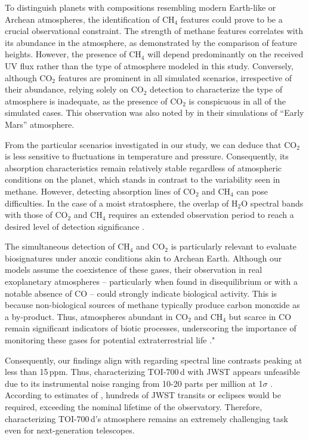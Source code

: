 To distinguish planets with compositions resembling modern Earth-like or Archean atmospheres, the identification of CH$_4$ features could prove to be a crucial observational constraint. 
The strength of methane features correlates with its abundance in the atmosphere, as demonstrated by the comparison of feature heights. However, the presence of CH$_4$ will depend predominantly on the received UV flux rather than the type of atmosphere modeled in this study. Conversely, although CO$_2$ features are prominent in all simulated scenarios, irrespective of their abundance, relying solely on CO$_2$ detection to characterize the type of atmosphere is inadequate, as the presence of CO$_2$ is conspicuous in all of the simulated cases. This observation was also noted by \cite{Suissa2020b} in their simulations of ``Early Mars'' atmosphere.

From the particular scenarios investigated in our study, we can deduce that CO$_2$ is less sensitive to fluctuations in temperature and pressure. Consequently, its absorption characteristics remain relatively stable regardless of atmospheric conditions on the planet, which stands in contrast to the variability seen in methane. However, detecting absorption lines of CO$_2$ and CH$_4$ can pose difficulties. In the case of a moist stratosphere, the overlap of H$_2$O spectral bands with those of CO$_2$ and CH$_4$ requires an extended observation period to reach a desired level of detection significance \citep[see][]{Mikal-Evans.et.al.2022MNRAS.510..980M}.

The simultaneous detection of CH$_4$ and CO$_2$ is particularly relevant to evaluate biosignatures under anoxic conditions akin to Archean Earth. Although our models assume the coexistence of these gases, their observation in real exoplanetary atmospheres -- particularly when found in disequilibrium or with a notable absence of CO -- could strongly indicate biological activity. This is because non-biological sources of methane typically produce carbon monoxide as a by-product. Thus, atmospheres abundant in CO$_2$ and CH$_4$ but scarce in CO remain significant indicators of biotic processes, underscoring the importance of monitoring these gases for potential extraterrestrial life \citep[see][]{Krissansen-Totton.et.al.2018SciA....4.5747K, Mikal-Evans.et.al.2022MNRAS.510..980M, Rotman.et.al.2023ApJ...942L...4R}."

Consequently, our findings align with \cite{Suissa2020b} regarding spectral line contrasts peaking at less than 15\,ppm. Thus, characterizing TOI-700\,d with JWST appears unfeasible due to its instrumental noise ranging from 10-20 parts per million at 1$\sigma$ \citep{Greene.et.al.2016ApJ...817...17G}. According to estimates of \cite{Suissa2020b}, hundreds of JWST transits or eclipses would be required, exceeding the nominal lifetime of the observatory. Therefore, characterizing TOI-700\,d's atmosphere remains an extremely challenging task even for next-generation telescopes.

